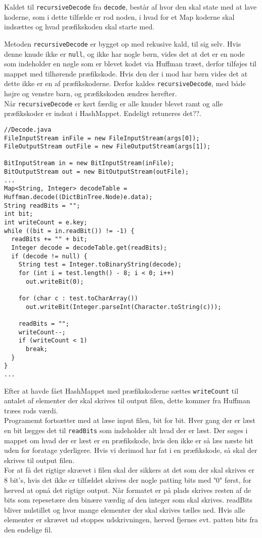 \documentclass{article}
\begin{document}
Kaldet til \texttt{recursiveDecode} fra \texttt{decode}, består af hvor den skal state med at lave koderne, som i dette tilfælde er rod noden, i hvad for et Map koderne skal indsættes og hvad præfikskoden skal starte med.

Metoden \texttt{recursiveDecode} er bygget op med rekusive kald, til sig selv. Hvis denne knude ikke er \texttt{null}, og ikke har nogle børn, vides det at det er en node som indeholder en nøgle som er blevet kodet via Huffman træet, derfor tilføjes til mappet med tilhørende præfikskode. Hvis den der i mod har børn vides det at dette ikke er en af præfikskoderne. Derfor kaldes \texttt{recursiveDecode}, med både højre og venstre barn, og præfikskoden ændres herefter.\\
Når \texttt{recursiveDecode} er kørt færdig er alle knuder blevet ramt og alle præfikskoder er indsat i HashMappet. Endeligt retuneres det??.
\begin{lstlisting}
//Decode.java
FileInputStream inFile = new FileInputStream(args[0]);
FileOutputStream outFile = new FileOutputStream(args[1]);

BitInputStream in = new BitInputStream(inFile);
BitOutputStream out = new BitOutputStream(outFile);
...
Map<String, Integer> decodeTable = Huffman.decode((DictBinTree.Node)e.data);
String readBits = "";
int bit;
int writeCount = e.key;
while ((bit = in.readBit()) != -1) {
  readBits += "" + bit;
  Integer decode = decodeTable.get(readBits);
  if (decode != null) {
    String test = Integer.toBinaryString(decode);
    for (int i = test.length() - 8; i < 0; i++) 
      out.writeBit(0);	

    for (char c : test.toCharArray())
      out.writeBit(Integer.parseInt(Character.toString(c)));

    readBits = "";
    writeCount--;
    if (writeCount < 1) 
      break;
  }
}
...
\end{lstlisting}
Efter at havde fået HashMappet med præfikskoderne sættes \texttt{writeCount} til antalet af elementer der skal skrives til output filen, dette kommer fra Huffman træes rods værdi.\\
Programemt fortsætter med at læse input filen, bit for bit. Hver gang der er læst en bit lægges det til \texttt{readBits} som indeholder alt hvad der er læst.
Der søges i mappet om hvad der er læst er en præfikskode, hvis den ikke er så læs næste bit uden for foratage yderligere. Hvis vi derimod har fat i en præfikskode, så skal der skrives til output filen. \\
For at få det rigtige skrævet i filen skal der sikkers at det som der skal skrives er 8 bit's, hvis det ikke er tilfældet skrives der nogle patting bits med "0" først, for herved at opnå det rigtige output. Når formatet er på plads skrives resten af de bits som repesetære den binære værdig af den integer som skal skrives. readBits bliver nulstillet og hvor mange elementer der skal skrives tælles ned. Hvis alle elementer er skrævet ud stoppes udskrivningen, herved fjernes evt. patten bits fra den endelige fil.
\newpage
\end{document}
